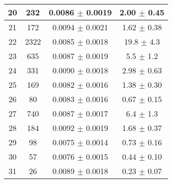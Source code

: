 \begin{table}
\begin{tabular}{c|c|c|c}
20 & 232  & 0.0086  $\pm$  0.0019  & 2.00 $\pm$ 0.45   \\\hline
21 & 172  & 0.0094  $\pm$  0.0021  & 1.62 $\pm$ 0.38   \\\hline
22 & 2322  & 0.0085  $\pm$  0.0018  & 19.8 $\pm$ 4.3   \\\hline
23 & 635  & 0.0087  $\pm$  0.0019  & 5.5 $\pm$ 1.2   \\\hline
24 & 331  & 0.0090  $\pm$  0.0018  & 2.98 $\pm$ 0.63   \\\hline
25 & 169  & 0.0082  $\pm$  0.0016  & 1.38 $\pm$ 0.30   \\\hline
26 & 80  & 0.0083  $\pm$  0.0016  & 0.67 $\pm$ 0.15   \\\hline
27 & 740  & 0.0087  $\pm$  0.0017  & 6.4 $\pm$ 1.3   \\\hline
28 & 184  & 0.0092  $\pm$  0.0019  & 1.68 $\pm$ 0.37   \\\hline
29 & 98  & 0.0075  $\pm$  0.0014  & 0.73 $\pm$ 0.16   \\\hline
30 & 57  & 0.0076  $\pm$  0.0015  & 0.44 $\pm$ 0.10   \\\hline
31 & 26  & 0.0089  $\pm$  0.0018  & 0.23 $\pm$ 0.07   \\\hline
\end{tabular}
\end{table}

